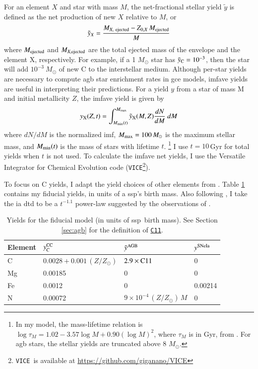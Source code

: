 \documentclass[12pt,oneside,letterpaper]{report}
\newcommand{\agb}{\gls{agb}}
\newcommand{\ia}{\gls{ia}}
\newcommand{\ssp}{\gls{ssp}}
\newcommand{\imf}{\gls{imf}}
\newcommand{\gce}{\gls{gce}}
\newcommand{\cxi}{\texttt{\hyperlink{C11}{C11}}}
\newcommand{\VICE}{\texttt{VICE}}
\newcommand{\Ycc}{\ensuremath{y_{\rm C}^{\rm CC}}}
\begin{document}
For an element $X$ and star with mass $M$, the net-fractional stellar \gls{yield} $\tilde{y}$ is defined as the net production of new $X$ relative to $M$, or
\begin{equation}
    \tilde{y}_{X} = \frac{M_{X,\ \rm ejected} - Z_{0, X}\,M_{\rm ejected}}{M}   
\end{equation}
where $M_{\rm ejected}$ and $M_{X, \rm ejected}$  are the total ejected mass of the envelope and the element X, respectively. For example, if a 1 $M_\odot$ star has $\tilde{y}_{\rm C} = 10^{-3}$, then the star will add $10^{-3}\ M_\odot$ of new C to the interstellar medium. 
Although per-star yields are necessary to compute \agb{} star enrichment rates in \gce{}  models, \gls{imfave} yields are useful in interpreting their predictions. For a yield $y$ from a star of mass M and initial metallicity $Z$, the \gls{imfave} yield is given by 
\begin{equation} \label{eq:imf-yield}
    y_{\rm X}(Z,t) = 
    \int_{M_{\rm min}(t)}^{M_{\rm max}} 
    \tilde{y}_{\rm X}(M, Z)
    \frac{dN}{dM}  \ dM
\end{equation}
where ${dN}/{dM}$ is the normalized \imf, $M_{\rm max}=100\,M_\odot$ is the maximum stellar mass, and $M_{\rm min}(t)$ is the mass of stars with lifetime $t$.%
\footnote{In my model, the mass-lifetime relation is
$\log \tau_M = 1.02 - 3.57\log M + 0.90 \left(\log M\right)^2$,
where $\tau_M$ is in Gyr,
from \citealt{larson74}.  For \agb{} stars, the stellar yields are truncated above 8 $M_{\odot}$. }
I use $t=10\,$Gyr for total yields when $t$ is not used.
To calculate the \gls{imfave} net yields, I use the Versatile Integrator for Chemical Evolution code (\VICE\footnote{\VICE~is available at \url{https://github.com/giganano/VICE}}).

To focus on C yields, I adapt the yield choices of other elements from \citet{james+21, james+23}.
Table \ref{tab:fiducial_mod} contains my fiducial \glspl{yield}, in units of a \ssp's birth mass.
Also following \citet{james+21, james+23}, I take the \ia{} \gls{dtd} to be a
$t^{-1.1}$ power-law suggested by the observations of \citet{maoz+12}.


\begin{table}
	\centering
    \caption[Fiducial Model Yields]{Yields for the fiducial model (in units of \ssp~birth mass). See Section \ref{sec:agb} for the definition of \cxi.}
	\label{tab:fiducial_mod}

	\begin{tabular}{l l l l}
		\toprule
        Element & $\Ycc$ & $\tilde{y}^{\rm AGB}$ & $y^{\rm SNe Ia}$ \\
		\midrule
        C & $0.0028 + 0.001\,(Z/Z_\odot)$ & $2.9\times{\rm C11}$ &  0 \\
        Mg & 0.00185 & 0 & 0 \\
        Fe & 0.0012 & 0 & 0.00214 \\
        N & 0.00072 & $9\times10^{-4}\,(Z/Z_\odot)\,M$ & 0\\
		\bottomrule
	\end{tabular}
\end{table}
\end{document}
